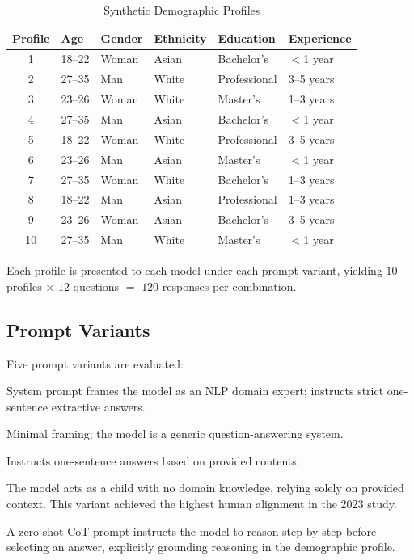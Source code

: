 \documentclass[11pt,a4paper]{article}
\begin{document}
\begin{table}[H]
\centering
\caption{Synthetic Demographic Profiles}
\label{tab:profiles}
\small
\begin{tabular}{clllll}
\toprule
\textbf{Profile} & \textbf{Age} & \textbf{Gender} & \textbf{Ethnicity} &
\textbf{Education} & \textbf{Experience} \\
\midrule
1 & 18--22 & Woman & Asian   & Bachelor's   & $<$1 year \\
2 & 27--35 & Man   & White   & Professional & 3--5 years \\
3 & 23--26 & Woman & White   & Master's     & 1--3 years \\
4 & 27--35 & Man   & Asian   & Bachelor's   & $<$1 year \\
5 & 18--22 & Woman & White   & Professional & 3--5 years \\
6 & 23--26 & Man   & Asian   & Master's     & $<$1 year \\
7 & 27--35 & Woman & White   & Bachelor's   & 1--3 years \\
8 & 18--22 & Man   & Asian   & Professional & 1--3 years \\
9 & 23--26 & Woman & Asian   & Bachelor's   & 3--5 years \\
10 & 27--35 & Man  & White   & Master's     & $<$1 year \\
\bottomrule
\end{tabular}
\end{table}

Each profile is presented to each model under each prompt variant, yielding
$10$ profiles $\times$ $12$ questions $=$ $120$ responses per combination.

\subsection{Prompt Variants}

Five prompt variants are evaluated:

\begin{description}[leftmargin=2em]
  \item[\textbf{P1 (Expert NLP)}] System prompt frames the model as an NLP
    domain expert; instructs strict one-sentence extractive answers.
  \item[\textbf{P2 (Plain QA)}] Minimal framing; the model is a generic
    question-answering system.
  \item[\textbf{P3 (Concise)}] Instructs one-sentence answers based on provided
    contents.
  \item[\textbf{P4 (Novice/Child Persona)}] The model acts as a child with no
    domain knowledge, relying solely on provided context. This variant achieved
    the highest human alignment in the 2023 study.
  \item[\textbf{P5 (Chain-of-Thought --- NEW)}] A zero-shot CoT prompt
    instructs the model to reason step-by-step before selecting an answer,
    explicitly grounding reasoning in the demographic profile.
\end{description}
\end{document}
